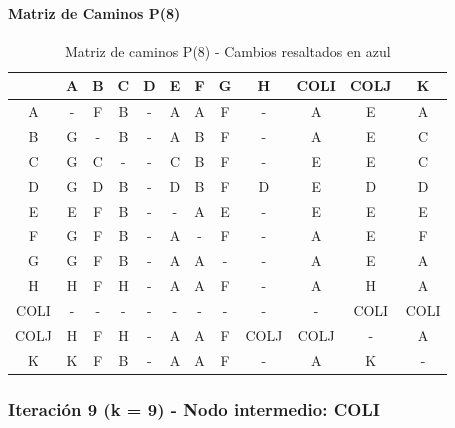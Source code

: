 \documentclass[12pt]{article}
\begin{document}
\paragraph{Matriz de Caminos P(8)}
\begin{table}[h!]
\centering
\begin{tabular}{|c|c|c|c|c|c|c|c|c|c|c|c|}
\hline
 & A & B & C & D & E & F & G & H & COLI & COLJ & K \\\hline
A & - & F & B & - & A & A & F & - & A & E & A \\\hline
B & G & - & B & - & A & B & F & - & A & E & C \\\hline
C & G & C & - & - & C & B & F & - & E & E & C \\\hline
D & G & D & B & - & D & B & F & D & E & D & D \\\hline
E & E & F & B & - & - & A & E & - & E & E & E \\\hline
F & G & F & B & - & A & - & F & - & A & E & F \\\hline
G & G & F & B & - & A & A & - & - & A & E & A \\\hline
H & H & F & H & - & A & A & F & - & A & H & A \\\hline
COLI & - & - & - & - & - & - & - & - & - & COLI & COLI \\\hline
COLJ & \cellcolor{lightblue} H & \cellcolor{lightblue} F & \cellcolor{lightblue} H & - & A & \cellcolor{lightblue} A & F & COLJ & COLJ & - & \cellcolor{lightblue} A \\\hline
K & K & F & B & - & A & A & F & - & A & K & - \\\hline
\end{tabular}
\caption{Matriz de caminos P(8) - Cambios resaltados en azul}
\end{table}

\subsubsection{Iteración 9 (k = 9) - Nodo intermedio: COLI}
\end{document}
